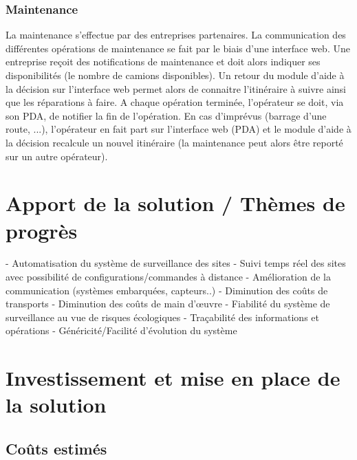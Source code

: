     \subsubsection{Maintenance}
La maintenance s'effectue par des entreprises partenaires. La communication des différentes opérations de maintenance se fait par le biais d'une interface web. Une entreprise reçoit des notifications de maintenance et doit alors indiquer ses disponibilités (le nombre de camions disponibles). Un retour du module d'aide à la décision sur l'interface web permet alors de connaitre l'itinéraire à suivre ainsi que les réparations à faire. A chaque opération terminée, l'opérateur se doit, via son PDA, de notifier la fin de l'opération. En cas d'imprévus (barrage d'une route, ...), l'opérateur en fait part sur l'interface web (PDA) et le module d'aide à la décision recalcule un nouvel itinéraire (la maintenance peut alors être reporté sur un autre opérateur). 
     
\section{Apport de la solution / Thèmes de progrès}


- Automatisation du système de surveillance des sites
- Suivi temps réel des sites avec possibilité de configurations/commandes à distance
- Amélioration de la communication (systèmes embarquées, capteurs..)
- Diminution des coûts de transports
- Diminution des coûts de main d'œuvre
- Fiabilité du système de surveillance au vue de risques écologiques
- Traçabilité des informations et opérations
- Généricité/Facilité d'évolution du système


\section{Investissement et mise en place de la solution}  
  \subsection{Coûts estimés}
  
